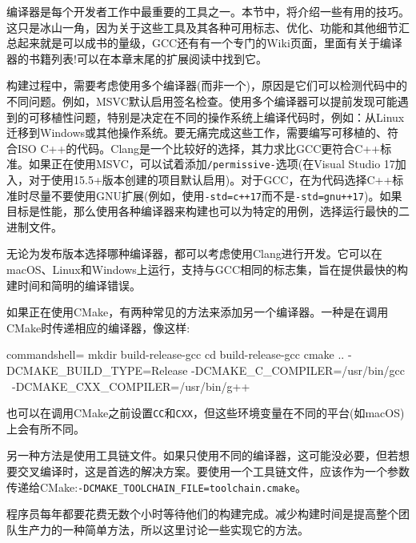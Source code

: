 
编译器是每个开发者工作中最重要的工具之一。本节中，将介绍一些有用的技巧。这只是冰山一角，因为关于这些工具及其各种可用标志、优化、功能和其他细节汇总起来就是可以成书的量级，GCC还有有一个专门的Wiki页面，里面有关于编译器的书籍列表!可以在本章末尾的扩展阅读中找到它。


构建过程中，需要考虑使用多个编译器(而非一个)，原因是它们可以检测代码中的不同问题。例如，MSVC默认启用签名检查。使用多个编译器可以提前发现可能遇到的可移植性问题，特别是决定在不同的操作系统上编译代码时，例如：从Linux迁移到Windows或其他操作系统。要无痛完成这些工作，需要编写可移植的、符合ISO C++的代码。Clang是一个比较好的选择，其力求比GCC更符合C++标准。如果正在使用MSVC，可以试着添加\texttt{/permissive-}选项(在Visual Studio 17加入，对于使用15.5+版本创建的项目默认启用)。对于GCC，在为代码选择C++标准时尽量不要使用GNU扩展(例如，使用\texttt{-std=c++17}而不是\texttt{-std=gnu++17})。如果目标是性能，那么使用各种编译器来构建也可以为特定的用例，选择运行最快的二进制文件。

\begin{tcolorbox}[colback=webgreen!5!white,colframe=webgreen!75!black, title=TIP]
\hspace*{0.7cm}无论为发布版本选择哪种编译器，都可以考虑使用Clang进行开发。它可以在macOS、Linux和Windows上运行，支持与GCC相同的标志集，旨在提供最快的构建时间和简明的编译错误。
\end{tcolorbox}

如果正在使用CMake，有两种常见的方法来添加另一个编译器。一种是在调用CMake时传递相应的编译器，像这样:

\begin{tcblisting}{commandshell={}}
mkdir build-release-gcc
cd build-release-gcc
cmake .. -DCMAKE_BUILD_TYPE=Release -DCMAKE_C_COMPILER=/usr/bin/gcc \
  -DCMAKE_CXX_COMPILER=/usr/bin/g++
\end{tcblisting}

也可以在调用CMake之前设置\texttt{CC}和\texttt{CXX}，但这些环境变量在不同的平台(如macOS)上会有所不同。

另一种方法是使用工具链文件。如果只使用不同的编译器，这可能没必要，但若想要交叉编译时，这是首选的解决方案。要使用一个工具链文件，应该作为一个参数传递给CMake:\texttt{-DCMAKE\_TOOLCHAIN\_FILE=toolchain.cmake}。


程序员每年都要花费无数个小时等待他们的构建完成。减少构建时间是提高整个团队生产力的一种简单方法，所以这里讨论一些实现它的方法。

